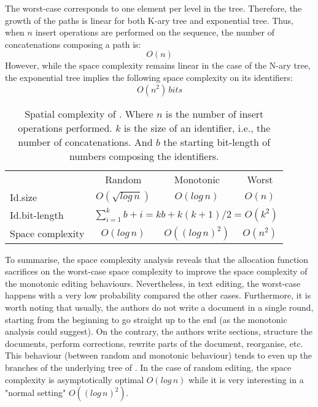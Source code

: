\begin{asparadesc}
\item [The worst-case] corresponds to one element per level in the
  tree. Therefore, the growth of the paths is linear for both K-ary tree and
  exponential tree. Thus, when $n$ insert operations are performed on the
  sequence, the number of concatenations composing a path is:
  \begin{equation} O(n) \end{equation} However, while the space complexity
  remains linear in the case of the N-ary tree, the exponential tree implies
  the following space complexity on its identifiers:
  \begin{equation} O(n^2) \, bits \end{equation}
\end{asparadesc}

\begin{table}
  \centering
  \begin{tabular}{@{}lccc@{}}
    \toprule
    & Random & Monotonic & Worst \\ \cmidrule{2-4}
    Id.size & $O(\sqrt{log\,n})$ & $O(log\,n)$ & $O(n)$ \\ \midrule
    Id.bit-length & \multicolumn{3}{c}{ $\sum\limits_{i=1}^{k}b+i =
      kb + k(k+1)/2 = O(k^2)$} \\ \midrule
    Space complexity & $O(log\,n)$ & $O((log\,n)^2)$ &
    $O(n^2)$ \\ \bottomrule
  \end{tabular}
  \caption{Spatial complexity of \NAME{}. Where $n$ is the number
    of insert operations performed. $k$ is the size of an identifier, i.e.,
    the number of concatenations. And $b$ the starting bit-length of numbers
    composing the identifiers.}
\end{table}

To summarise, the space complexity analysis reveals that the allocation
function \NAME{} sacrifices on the worst-case space complexity to improve the
space complexity of the monotonic editing behaviours. Nevertheless, in text
editing, the worst-case happens with a very low probability compared the other
cases. Furthermore, it is worth noting that usually, the authors do not write a
document in a single round, starting from the beginning to go straight up to
the end (as the monotonic analysis could suggest). On the contrary, the authors
write sections, structure the documents, perform corrections, rewrite parts of
the document, reorganise, etc. This behaviour (between random and monotonic
behaviour) tends to even up the branches of the underlying tree of \NAME{}. In
the case of random editing, the space complexity is asymptotically optimal
$O(log\,n)$ while it is very interesting in a "normal setting" $O((log\,n)^2)$.


